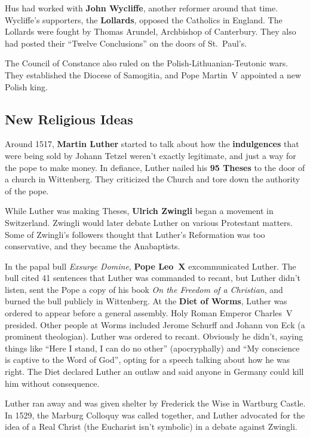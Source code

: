 Hus had worked with \textbf{John Wycliffe}, another reformer around that time.
Wycliffe's supporters, the \textbf{Lollards}, opposed the Catholics in England.
The Lollards were fought by Thomas Arundel, Archbishop of Canterbury.
They also had posted their ``Twelve Conclusions'' on the doors of St.\ Paul's.

The Council of Constance also ruled on the Polish-Lithuanian-Teutonic wars.
They established the Diocese of Samogitia, and Pope Martin~V appointed a new Polish king.

\subsection*{New Religious Ideas}

Around 1517, \textbf{Martin Luther} started to talk about how the \textbf{indulgences}
that were being sold by Johann Tetzel weren't exactly legitimate, and just a way for the pope to make money.
In defiance, Luther nailed his \textbf{95 Theses} to the door of a church in Wittenberg.
They criticized the Church and tore down the authority of the pope.

While Luther was making Theses, \textbf{Ulrich Zwingli} began a movement in Switzerland.
Zwingli would later debate Luther on various Protestant matters.
Some of Zwingli's followers thought that Luther's Reformation was too conservative, and they became the Anabaptists.

In the papal bull \textit{Exsurge Domine}, \textbf{Pope Leo~X} excommunicated Luther.
The bull cited 41 sentences that Luther was commanded to recant,
but Luther didn't listen, sent the Pope a copy of his book \textit{On the Freedom of a Christian},
and burned the bull publicly in Wittenberg.
At the \textbf{Diet of Worms}, Luther was ordered to appear before a general assembly.
Holy Roman Emperor Charles~V presided.
Other people at Worms included Jerome Schurff and Johann von Eck (a prominent theologian).
Luther was ordered to recant.
Obviously he didn't, saying things like
``Here I stand, I can do no other'' (apocryphally) and
``My conscience is captive to the Word of God'',
opting for a speech talking about how he was right.
The Diet declared Luther an outlaw and said anyone in Germany could kill him without consequence.

Luther ran away and was given shelter by Frederick the Wise in Wartburg Castle.
In 1529, the Marburg Colloquy was called together,
and Luther advocated for the idea of a Real Christ (the Eucharist isn't symbolic) in a debate against Zwingli.

